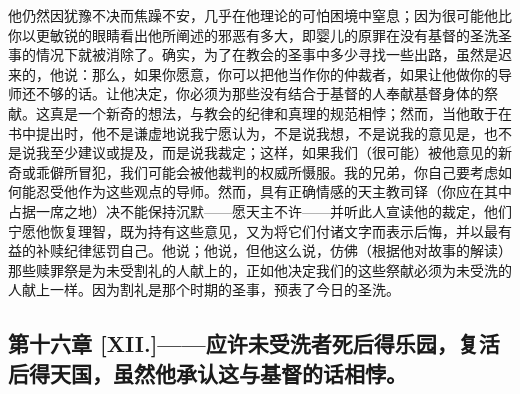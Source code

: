 他仍然因犹豫不决而焦躁不安，几乎在他理论的可怕困境中窒息；因为很可能他比你以更敏锐的眼睛看出他所阐述的邪恶有多大，即婴儿的原罪在没有基督的圣洗圣事的情况下就被消除了。确实，为了在教会的圣事中多少寻找一些出路，虽然是迟来的，他说：那么，如果你愿意，你可以把他当作你的仲裁者，如果让他做你的导师还不够的话。让他决定，你必须为那些没有结合于基督的人奉献基督身体的祭献。这真是一个新奇的想法，与教会的纪律和真理的规范相悖；然而，当他敢于在书中提出时，他不是谦虚地说我宁愿认为，不是说我想，不是说我的意见是，也不是说我至少建议或提及，而是说我裁定；这样，如果我们（很可能）被他意见的新奇或乖僻所冒犯，我们可能会被他裁判的权威所慑服。我的兄弟，你自己要考虑如何能忍受他作为这些观点的导师。然而，具有正确情感的天主教司铎（你应在其中占据一席之地）决不能保持沉默——愿天主不许——并听此人宣读他的裁定，他们宁愿他恢复理智，既为持有这些意见，又为将它们付诸文字而表示后悔，并以最有益的补赎纪律惩罚自己。他说；他说，但他这么说，仿佛（根据他对故事的解读）那些赎罪祭是为未受割礼的人献上的，正如他决定我们的这些祭献必须为未受洗的人献上一样。因为割礼是那个时期的圣事，预表了今日的圣洗。\par


\subsection{第十六章 [XII.]——应许未受洗者死后得乐园，复活后得天国，虽然他承认这与基督的话相悖。}

